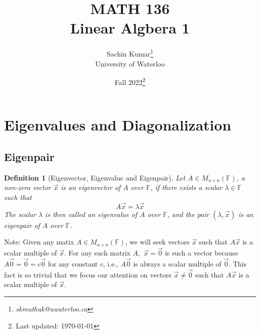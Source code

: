 \documentclass[10pt]{article}
\theoremstyle{break}
\newtheorem{defn}{Definition}[subsection]
\newcommand{\subject}{MATH 136 \\ Linear Algbera 1}
\newcommand{\semester}{Fall 2022}
\begin{document}
\let\ref\Cref

\title{\subject}
\author{Sachin Kumar\thanks{\itshape skmuthuk@uwaterloo.ca}\\ University of Waterloo}
\date{\semester\thanks{Last updated: \today}}

\maketitle
\newpage
\tableofcontents
\newpage







\section{Eigenvalues and Diagonalization}

\subsection{Eigenpair}
\begin{defn}[Eigenvector, Eigenvalue and Eigenpair]
    Let $A\in M_{n \times n}(\mathbb{F})$, a non-zero vector $\vec{x}$ is an eigenvector of $A$ over $\mathbb{F}$, if there exists a scalar $\lambda \in \mathbb{F}$ such that 
    $$A\vec{x} = \lambda \vec{x}$$
    The scalar $\lambda$  is then called an eigenvalue of $A$ over $\mathbb{F}$, and the pair $(\lambda, \vec{x})$ is an eigenpair of $A$ over $\mathbb{F}$.
\end{defn}
Note:
Given any matix $A \in M_{n \times n}(\mathbb{F})$, we will seek vectors $\vec{x} $ such that $A\vec{x}$ is a scalar multiple of $\vec{x}$. For any such matrix $A, $ $\vec{x} = \vec{0}$ is such a vector because $A\vec{0} = \vec{0} = c\vec{0}$ for any constant $c$, i.e., $A \vec{0}$ is always a scalar multiple of $\vec{0}$. This fact is so trivial that we focus our attention on vectors $\vec{x} \ne \vec{0}$ such that $A \vec{x} $ is a scalar multiple of $\vec{x}$.
\end{document}
